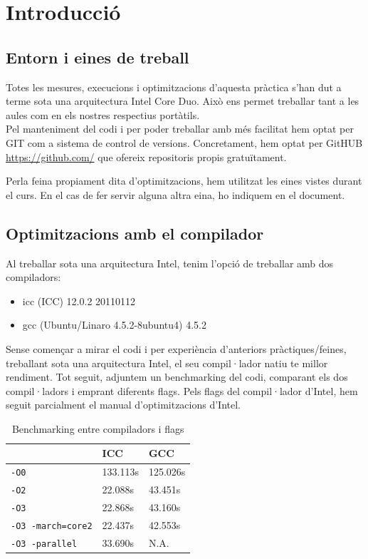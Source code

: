 \chapter{Introducci\'o}

\section{Entorn i eines de treball}
Totes les mesures, execucions i optimitzacions d'aquesta pràctica s'han dut a terme sota una arquitectura Intel Core Duo. Això ens permet treballar tant a les aules com en els nostres respectius portàtils.\\

Pel manteniment del codi i per poder treballar amb més facilitat hem optat per GIT com a sistema de control de versions. Concretament, hem optat per GitHUB \url{https://github.com/} que ofereix repositoris propis gratuïtament.

Perla feina propiament dita d'optimitzacions, hem utilitzat les eines vistes durant el curs. En el cas de fer servir alguna altra eina, ho indiquem en el document.

\section{Optimitzacions amb el compilador}
Al treballar sota una arquitectura Intel, tenim l'opció de treballar amb dos compiladors:

\begin{itemize}
  \item icc (ICC) 12.0.2 20110112
  \item gcc (Ubuntu/Linaro 4.5.2-8ubuntu4) 4.5.2
\end{itemize}

Sense començar a mirar el codi i per experiència d'anteriors pràctiques/feines, treballant sota una arquitectura Intel, el seu compil·lador natiu te millor rendiment. Tot seguit, adjuntem un benchmarking del codi, comparant els dos compil·ladors i emprant diferents flags. Pels flags del compil·lador d'Intel, hem seguit parcialment el manual d'optimitzacions d'Intel.

\begin{table}
\begin{center}
\begin{tabular}{lll}
\hline
 & ICC & GCC \\
\hline
\texttt{-O0} & 133.113s & 125.026s \\
\texttt{-O2} & 22.088s & 43.451s \\
\texttt{-O3} & 22.868s & 43.160s \\
\texttt{-O3 -march=core2} & 22.437s & 42.553s \\
\texttt{-O3 -parallel} & 33.690s & N.A.\\
\hline
\end{tabular}
\caption{Benchmarking entre compiladors i flags}
\end{center}
\label{table1}
\end{table}

